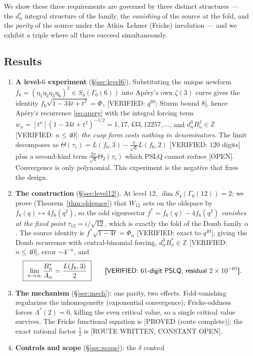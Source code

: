 \documentclass[11pt,reqno]{amsart}
\theoremstyle{plain}
\theoremstyle{definition}
\theoremstyle{remark}
\newcommand{\Z}{\mathbb{Z}}
\newcommand{\fs}{f^{*}}
\newcommand{\ProvedS}{\textup{\textsf{[PROVED (route complete)]}}}
\newcommand{\VerifiedR}[1]{\textup{\textsf{[VERIFIED: #1]}}}
\newcommand{\Open}{\textup{\textsf{[OPEN]}}}
\newcommand{\RouteOpen}{\textup{\textsf{[ROUTE WRITTEN, CONSTANT OPEN]}}}
\begin{document}
We show these three requirements are governed by three distinct structures
--- the $d_n^r$ integral structure of the family, the \emph{vanishing} of
the source at the fold, and the \emph{parity} of the source under the
Atkin--Lehner (Fricke) involution --- and we exhibit a triple where all
three succeed simultaneously.

\subsection{Results}
\begin{enumerate}[leftmargin=2em]
\item \textbf{A level-$6$ experiment} (\S\ref{sec:level6}). Substituting the
unique newform $f_6=(\eta_1\eta_2\eta_3\eta_6)^2\in S_4(\Gamma_0(6))$ into
Ap\'ery's own $\zeta(3)$ curve gives the identity
$f_6\sqrt{1-34t+t^2}=\Phi_\gamma$ \VerifiedR{$q^{60}$; Sturm bound $8$},
hence Ap\'ery's recurrence \eqref{eq:apery} with the integral forcing term
$w_n=[t^n](1-34t+t^2)^{-1/2}=1,17,433,12257,\dots$, and
$d_n^3B^f_n\in\Z$ \VerifiedR{$n\le 40$}: \emph{the cusp form costs nothing
in denominators}. The limit decomposes as
$\Theta(\tau_c)=L(f_6,3)-\tfrac\pi{\sqrt6}L(f_6,2)$
\VerifiedR{$120$ digits} plus a second-kind term
$\tfrac{2\pi}{\sqrt6}\Theta_2(\tau_c)$ which PSLQ cannot reduce \Open.
Convergence is only polynomial. This experiment is the negative that
fixes the design.
\item \textbf{The construction} (\S\ref{sec:level12}). At level $12$,
$\dim S_4(\Gamma_0(12))=2$; we prove (Theorem~\ref{thm:oldspace}) that
$W_{12}$ acts on the oldspace by $f_6(q)\mapsto4f_6(q^2)$, so the odd
eigenvector $\fs=f_6(q)-4f_6(q^2)$ \emph{vanishes at the fixed point}
$\tau_{12}=i/\sqrt{12}$, which is exactly the fold of the Domb family
$\alpha$. The source identity is $\fs\sqrt{1-4t}=\Phi_\alpha$
\VerifiedR{exact to $q^{40}$}, giving the Domb recurrence with
central-binomial forcing, $d_n^3B^*_n\in\Z$ \VerifiedR{$n\le40$}, error
$\sim4^{-n}$, and
\[
\boxed{\ \lim_{n\to\infty}\frac{B^*_n}{A_n}=\frac{L(f_6,3)}{2}\ }
\qquad\VerifiedR{$61$-digit PSLQ, residual $2\times10^{-61}$}.
\]
\item \textbf{The mechanism} (\S\ref{sec:mech}): one parity, two effects.
Fold-vanishing regularizes the inhomogeneity (exponential convergence);
Fricke-oddness forces $\Lambda^*(2)=0$, killing the even critical value, so
a single critical value survives. The Fricke functional equation is
\ProvedS; the exact rational factor $\tfrac12$ is \RouteOpen.
\item \textbf{Controls and scope} (\S\ref{sec:scope}): the $\delta$ control

\end{enumerate}
\end{document}
